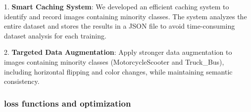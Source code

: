 \documentclass[conference]{IEEEtran}
\begin{document}


    
    
1. \textbf{Smart Caching System}: We developed an efficient caching system to identify and record images containing minority classes. The system analyzes the entire dataset and stores the results in a JSON file to avoid time-consuming dataset analysis for each training.

2. \textbf{Targeted Data Augmentation}: Apply stronger data augmentation to images containing minority classes (MotorcycleScooter and Truck\_Bus), including horizontal flipping and color changes, while maintaining semantic consistency.


\subsubsection{loss functions and optimization}





        
\end{document}
